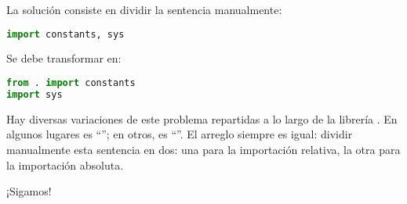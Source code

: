 La solución consiste en dividir la sentencia manualmente:

\begin{lstlisting}[language=Python,breaklines=true]
import constants, sys
\end{lstlisting}

Se debe transformar en:

\begin{lstlisting}[language=Python,breaklines=true]
from . import constants
import sys
\end{lstlisting}

Hay diversas variaciones de este problema repartidas a lo largo de la librería . En algunos lugares es ``''; en otros, es ``''. El arreglo siempre es igual: dividir manualmente esta sentencia en dos: una para la importación relativa, la otra para la importación absoluta.

¡Sigamos!


